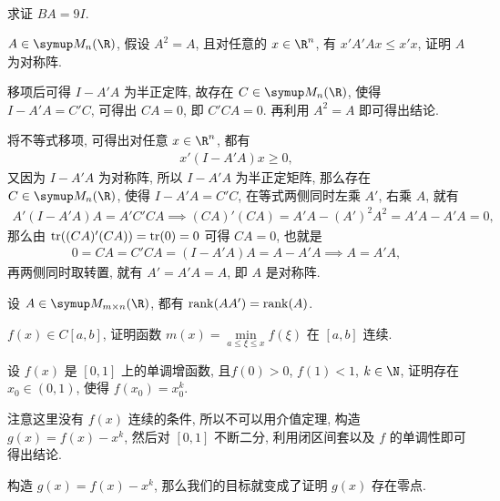 \begin{exercise}[series=exer]
\begin{align*}
  \end{align*}
  求证 $ BA = 9 I $.
  \item $ A\in \MM $, 假设 $ A^{2} = A $, 且对任意的 $ x \in \R^{n} $, 有 $ x'A'Ax \le x'x $, 证明 $ A $ 为对称阵.
  \begin{hint}
      移项后可得 $ I - A'A $ 为半正定阵, 故存在 $ C \in \MM $, 使得 $ I - A'A = C'C $, 可得出 $ CA = 0 $, 即 $ C'CA = 0 $. 再利用 $ A^{2} = A $ 即可得出结论.
  \end{hint}
  \begin{answer}
      将不等式移项, 可得出对任意 $ x \in \R^{n} $, 都有
      \begin{align*}
          x'(I - A'A)x \ge 0,
      \end{align*}
      又因为 $ I - A'A $ 为对称阵, 所以 $ I - A'A $ 为半正定矩阵, 那么存在 $ C \in \MM $, 使得 $ I - A'A = C'C $, 在等式两侧同时左乘 $ A' $, 右乘 $ A $, 就有
      \begin{align*}
          A'(I - A'A)A = A'C'CA \implies (CA)'(CA) = A'A - (A')^{2}A^{2} = A'A - A'A = 0,
      \end{align*}
      那么由 $ \tr((CA)'(CA)) = \tr(0) = 0 $ 可得 $ CA = 0 $, 也就是
      \begin{align*}
          0 = CA = C'CA = (I - A'A)A = A - A'A \implies A = A'A,
      \end{align*}
      再两侧同时取转置, 就有 $ A' = A'A = A $, 即 $ A $ 是对称阵.
  \end{answer}
  \item 设 $ A \in \MM[\R][m \times n] $, 都有 $ \rank(AA') = \rank(A) $.
  \item $ f(x) \in C[a, b] $, 证明函数 $ m(x) = \min\limits_{a \le \xi \le x}f(\xi) $ 在 $ [a, b] $ 连续.
  \item 设 $ f(x) $ 是 $ [0, 1] $ 上的单调增函数, 且$ f(0) > 0 $, $ f(1) < 1 $, $ k \in \N $, 证明存在 $ x_{0} \in (0, 1) $, 使得 $ f(x_{0}) = x_{0}^{k} $.
  \begin{hint}
      注意这里没有 $ f(x) $ 连续的条件, 所以不可以用介值定理, 构造 $ g(x) = f(x) - x^{k} $, 然后对 $ [0, 1] $ 不断二分, 利用闭区间套以及 $ f $ 的单调性即可得出结论.
  \end{hint}
  \begin{answer}
      构造 $ g(x) = f(x) - x^{k} $, 那么我们的目标就变成了证明 $ g(x) $ 存在零点.


\end{answer}
\end{exercise}

